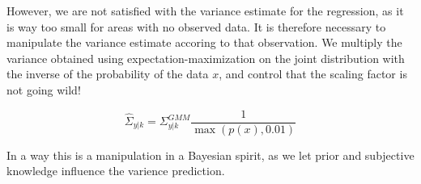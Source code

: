 However, we are not satisfied with the variance estimate for the regression, as it is way too small for areas with
no observed data. It is therefore necessary to manipulate the variance estimate accoring to that observation. 
We multiply the variance obtained using expectation-maximization on the joint distribution with the
inverse of the probability of the data $x$, and control that the scaling factor is not going wild!

$$\hat\Sigma_{y|k} =\Sigma_{y|k}^{GMM} \frac{1}{\max(p(x), 0.01)}$$

In a way this is a manipulation in a Bayesian spirit, as we let prior and subjective knowledge influence the
varience prediction. 
